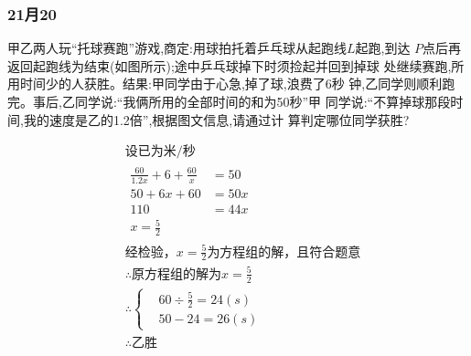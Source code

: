 \documentclass[answers]{exam} %
\begin{document}
\begin{questions}
\subsubsection{21月20}

\begin{questions}
\question
  甲乙两人玩“托球赛跑”游戏,商定:用球拍托着乒乓球从起跑线$L$起跑,到达
  $P$点后再返回起跑线为结束(如图所示);途中乒乓球掉下时须捡起并回到掉球
  处继续赛跑,所用时间少的人获胜。结果:甲同学由于心急,掉了球,浪费了6秒
  钟,乙同学则顺利跑完。事后,乙同学说:“我俩所用的全部时间的和为50秒”甲
  同学说:“不算掉球那段时间,我的速度是乙的1.2倍”,根据图文信息,请通过计
  算判定哪位同学获胜?

\begin{center}
\begin{tikzpicture}[scale=2.0]
\end{tikzpicture}
\end{center}

\vspace*{1in}
\begin{solution}
  \[
    \begin{aligned}
      & \mbox{设已为}\mbox{米/秒} \\
      & \begin{aligned}
        \frac{60}{1.2x} + 6 + \frac{60}{x} &= 50 \\
        50 + 6x + 60 &= 50x \\
        110 &= 44x \\
        x = \frac{5}{2}
      \end{aligned} \\
      & \mbox{经检验，} x = \frac{5}{2} \mbox{为方程组的解，且符合题意} \\
      & \therefore \mbox{原方程组的解为} x = \frac{5}{2} \\
      & \therefore \begin{cases}
        & 60 \div \frac{5}{2} = 24 (s) \\
        & 50 - 24 = 26 (s)
      \end{cases} \\
      & \therefore \mbox{乙胜} 
    \end{aligned}
  \]
\end{solution}

\end{questions}

\end{questions}
\end{document}
